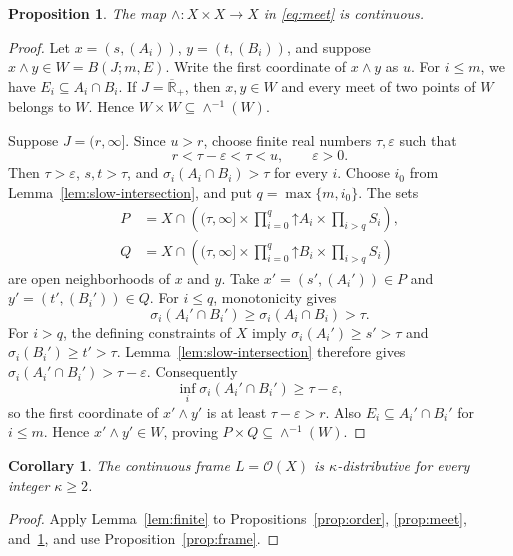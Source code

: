 \documentclass[11pt]{amsart}
\newtheorem{proposition}[theorem]{Proposition}
\newtheorem{corollary}[theorem]{Corollary}
\theoremstyle{definition}
\theoremstyle{remark}
\numberwithin{equation}{section}
\newcommand{\OO}{\mathcal O}
\newcommand{\RR}{\overline{\mathbb R}_{+}}
\newcommand{\up}{\mathord\uparrow}
\begin{document}
\begin{proposition}\label{prop:continuous-meet}
The map $\wedge:X\times X\longrightarrow X$ in \eqref{eq:meet}
is continuous.
\end{proposition}

\begin{proof}
Let $x=(s,(A_i))$, $y=(t,(B_i))$, and suppose
$x\wedge y\in W=B(J;m,E)$. Write the first coordinate of
$x\wedge y$ as $u$. For $i\leq m$, we have $E_i\subseteq A_i\cap B_i$.
If $J=\RR$, then $x,y\in W$ and every meet of two points of $W$
belongs to $W$. Hence $W\times W\subseteq\wedge^{-1}(W)$.

Suppose $J=(r,\infty]$. Since $u>r$, choose finite real numbers
$\tau,\varepsilon$ such that
\begin{equation}\label{eq:margin}
r<\tau-\varepsilon<\tau<u,\qquad\varepsilon>0.
\end{equation}
Then $\tau>\varepsilon$, $s,t>\tau$, and
$\sigma_i(A_i\cap B_i)>\tau$ for every $i$.
Choose $i_0$ from Lemma~\ref{lem:slow-intersection}, and put
$q=\max\{m,i_0\}$. The sets
\begin{align*}
P&=X\cap\left((\tau,\infty]\times\prod_{i=0}^{q}\up A_i
                                      \times\prod_{i>q}S_i\right),\\
Q&=X\cap\left((\tau,\infty]\times\prod_{i=0}^{q}\up B_i
                                      \times\prod_{i>q}S_i\right)
\end{align*}
are open neighborhoods of $x$ and $y$.
Take $x'=(s',(A_i'))\in P$ and $y'=(t',(B_i'))\in Q$.
For $i\leq q$, monotonicity gives
\[
\sigma_i(A_i'\cap B_i')\geq\sigma_i(A_i\cap B_i)>\tau.
\]
For $i>q$, the defining constraints of $X$ imply
$\sigma_i(A_i')\geq s'>\tau$ and
$\sigma_i(B_i')\geq t'>\tau$. Lemma~\ref{lem:slow-intersection}
therefore gives $\sigma_i(A_i'\cap B_i')>\tau-\varepsilon$.
Consequently
\[
\inf_i\sigma_i(A_i'\cap B_i')\geq\tau-\varepsilon,
\]
so the first coordinate of $x'\wedge y'$ is at least
$\tau-\varepsilon>r$. Also $E_i\subseteq A_i'\cap B_i'$ for
$i\leq m$. Hence $x'\wedge y'\in W$, proving
$P\times Q\subseteq\wedge^{-1}(W)$.
\end{proof}

\begin{corollary}\label{cor:finite-dist}
The continuous frame $L=\OO(X)$ is $\kappa$-distributive for every
integer $\kappa\geq2$.
\end{corollary}

\begin{proof}
Apply Lemma~\ref{lem:finite} to Propositions~\ref{prop:order},
\ref{prop:meet}, and~\ref{prop:continuous-meet}, and use
Proposition~\ref{prop:frame}.
\end{proof}
\end{document}
